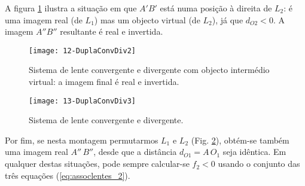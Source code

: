 \documentclass[a4paper,12pt]{article}      %
\begin{document}
A figura \ref{fig:DuplaConvDiv2} ilustra a situação em que $A'B'$ está numa posição à direita de $L_2$: é uma imagem real (de $L_1$) mas um objecto virtual (de $L_2$), já que $d_{O2}<0$. A imagem $A''B''$ resultante é real e invertida.

\begin{figure}	[!htb] 
\begin{center}
	\texttt{[image: 12-DuplaConvDiv2]}
	\caption{Sistema de lente convergente e divergente com objecto intermédio virtual: a imagem final é real e invertida. \label{fig:DuplaConvDiv2}} 
\end{center}
\end{figure}

\begin{figure}	[!htb]  
\begin{center}
	\texttt{[image: 13-DuplaConvDiv3]}
\end{center}
	\caption{Sistema de lente convergente e divergente.  \label{fig:DuplaConvDiv3}} 
\end{figure}


Por fim, se nesta montagem permutarmos $L_1$ e $L_2$ (Fig. \ref{fig:DuplaConvDiv3}), obtém-se também uma imagem real  $A''\,B''$, desde que a distância $d_{O1}=A\,O_1$ seja idêntica.
Em qualquer destas situações, pode sempre calcular-se $f_2 < 0$ usando o conjunto das três equações (\ref{eq:assoclentes_2}).
\clearpage


\end{document}
